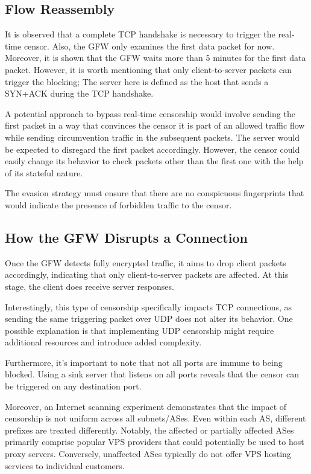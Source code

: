 \subsection{Flow Reassembly}
It is observed that a complete TCP handshake is necessary to trigger the real-time censor. Also, the GFW only examines the first data packet for now. Moreover, it is shown that the GFW waits more than 5 minutes for the first data packet. However, it is worth mentioning that only client-to-server packets can trigger the blocking; The server here is defined as the host that sends a SYN+ACK during the TCP handshake.\cite{wu2023great}

A potential approach to bypass real-time censorship would involve sending the first packet in a way that convinces the censor it is part of an allowed traffic flow while sending circumvention traffic in the subsequent packets. The server would be expected to disregard the first packet accordingly. However, the censor could easily change its behavior to check packets other than the first one with the help of its stateful nature.

The evasion strategy must ensure that there are no conspicuous fingerprints that would indicate the presence of forbidden traffic to the censor.

\subsection{How the GFW Disrupts a Connection}
Once the GFW detects fully encrypted traffic, it aims to drop client packets accordingly, indicating that only client-to-server packets are affected. At this stage, the client does receive server responses.

Interestingly, this type of censorship specifically impacts TCP connections, as sending the same triggering packet over UDP does not alter its behavior. One possible explanation is that implementing UDP censorship might require additional resources and introduce added complexity.

Furthermore, it's important to note that not all ports are immune to being blocked. Using a sink server that listens on all ports reveals that the censor can be triggered on any destination port.

Moreover, an Internet scanning experiment demonstrates that the impact of censorship is not uniform across all subnets/ASes. Even within each AS, different prefixes are treated differently. Notably, the affected or partially affected ASes primarily comprise popular VPS providers that could potentially be used to host proxy servers. Conversely, unaffected ASes typically do not offer VPS hosting services to individual customers.\cite{wu2023great}


